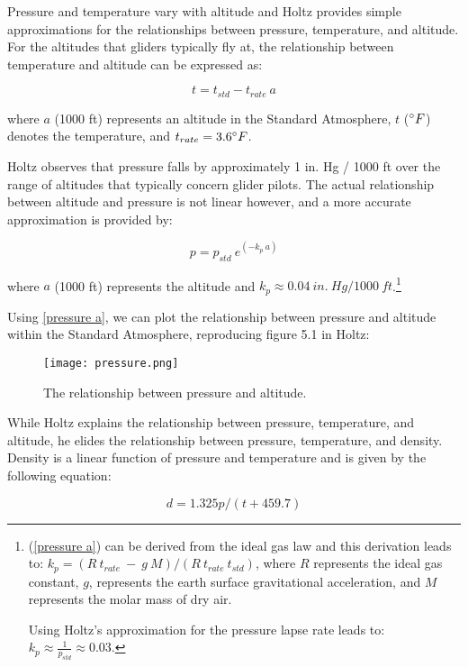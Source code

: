 \documentclass[10pt,a4paper]{article}
\begin{document}
Pressure and temperature vary with altitude and Holtz provides simple approximations for the relationships between pressure, temperature, and altitude. For the altitudes that gliders typically fly at, the relationship between temperature and altitude can be expressed as:

\begin{equation}
t = t_{std} - t_{rate}\ a
\end{equation}

where $a$ (1000 ft) represents an altitude in the Standard Atmosphere, $t$ ($\degree F$) denotes the temperature, and $t_{rate} = 3.6\degree F$.

Holtz observes that pressure falls by approximately 1 in. Hg / 1000 ft over the range of altitudes that typically concern glider pilots. The actual relationship between altitude and pressure is not linear however, and a more accurate approximation is provided by:

\begin{equation}\label{pressure a}
p = p_{std}\ e^{(- k_{p}\ a)}
\end{equation}

where $a$ (1000 ft) represents the altitude and $k_{p} \approx 0.04\ in.\ Hg/1000\ ft$.\footnote{(\ref{pressure a}) can be derived from the ideal gas law and this derivation leads to: $k_{p} = (R\ t_{rate}\ -\ g\ M)/(R\ t_{rate}\ t_{std})$, where $R$ represents the ideal gas constant, $g$, represents the earth surface gravitational acceleration, and $M$ represents the molar mass of dry air.

Using Holtz's approximation for the pressure lapse rate leads to: $k_{p} \approx \frac{1}{p_{std}} \approx 0.03.$}

Using \ref{pressure a}, we can plot the relationship between pressure and altitude within the Standard Atmosphere, reproducing figure 5.1 in Holtz:

\begin{figure}[h]
\texttt{[image: pressure.png]} 
\caption{The relationship between pressure and altitude.}
\end{figure}

While Holtz explains the relationship between pressure, temperature, and altitude, he elides the relationship between pressure, temperature, and density. Density is a linear function of pressure and temperature and is given by the following equation:

\begin{equation}
\label{density p t}
d = 1.325 p / (t + 459.7)
\end{equation}
\end{document}
